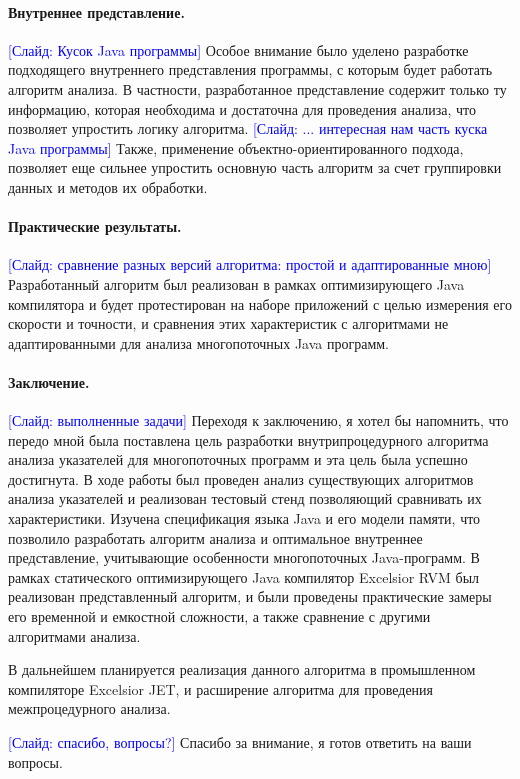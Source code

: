 \documentclass[12pt]{article}
\newcommand{\slide}[1]{\textcolor{Blue}{[Слайд: #1]}}
\begin{document}
  \paragraph{Внутреннее представление.}
  \slide{Кусок Java программы}
  Особое внимание было уделено разработке подходящего внутреннего
  представления программы, с которым будет работать алгоритм анализа.
  В частности, разработанное представление содержит только ту информацию,
  которая необходима и достаточна для проведения анализа, что позволяет
  упростить логику алгоритма.
  \slide{... интересная нам часть куска Java программы}
  Также, применение объектно-ориентированного подхода, позволяет еще сильнее
  упростить основную часть алгоритм за счет группировки данных и методов их
  обработки.

  \paragraph{Практические результаты.}
  \slide{сравнение разных версий алгоритма: простой и адаптированные мною}
  Разработанный алгоритм был реализован в рамках оптимизирующего Java
  компилятора и будет протестирован на наборе приложений с целью измерения его
  скорости и точности, и сравнения этих характеристик с алгоритмами не
  адаптированными для анализа многопоточных Java программ.

  \paragraph{Заключение.}
  \slide{выполненные задачи}
  Переходя к заключению, я хотел бы напомнить, что передо мной была поставлена
  цель разработки внутрипроцедурного алгоритма анализа указателей для
  многопоточных программ и эта цель была успешно достигнута.
  В ходе работы был проведен анализ существующих алгоритмов анализа указателей
  и реализован тестовый стенд позволяющий сравнивать их характеристики.
  Изучена спецификация языка Java и его модели памяти, что позволило
  разработать алгоритм анализа и оптимальное внутреннее представление,
  учитывающие особенности многопоточных Java-программ. В рамках статического
  оптимизирующего Java компилятор Excelsior RVM был реализован представленный
  алгоритм, и были проведены практические замеры его временной и емкостной
  сложности, а также сравнение с другими алгоритмами анализа.

  В дальнейшем планируется реализация данного алгоритма в промышленном
  компиляторе Excelsior JET, и расширение алгоритма для проведения
  межпроцедурного анализа.

  \slide{спасибо, вопросы?}
  Спасибо за внимание, я готов ответить на ваши вопросы.
\end{document}
